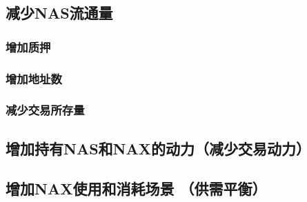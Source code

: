 \subsection{减少NAS流通量}
\subsubsection{增加质押}
\subsubsection{增加地址数}
\subsubsection{减少交易所存量}
\subsection{增加持有NAS和NAX的动力（减少交易动力）}
\subsection{增加NAX使用和消耗场景 （供需平衡）}
